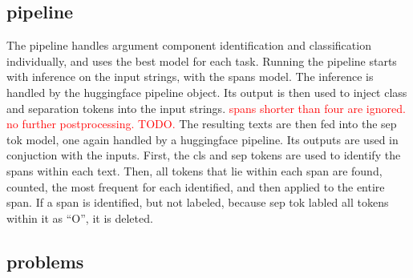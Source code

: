 \documentclass[12]{article}
\theoremstyle{mytheoremstyle}
\theoremstyle{mytheoremstyle}
\theoremstyle{myproblemstyle}
\begin{document}
  \subsection{pipeline} \label{pipeline}
  The pipeline handles argument component identification and classification individually, and uses the best model for each task. Running the pipeline starts with inference on the input strings, with the spans model. The inference is handled by the huggingface pipeline object. Its output is then used to inject class and separation tokens into the input strings. \textcolor{red}{spans shorter than four are ignored. no further postprocessing. TODO.} The resulting texts are then fed into the sep tok model, one again handled by a huggingface pipeline. 
  Its outputs are used in conjuction with the inputs. First, the cls and sep tokens are used to identify the spans within each text. Then, all tokens that lie within each span are found, counted, the most frequent for each identified, and then applied to the entire span. If a span is identified, but not labeled, because sep tok labled all tokens within it as ``O'', it is deleted.
  \subsection{problems} \label{problems}
\end{document}
